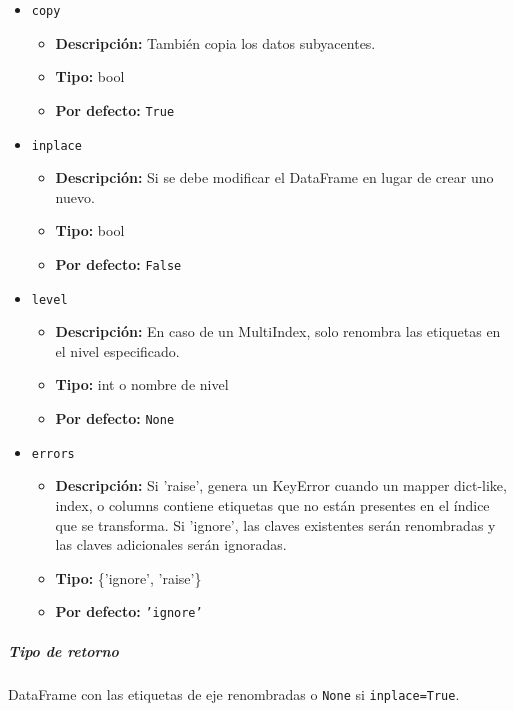 \begin{itemize}
    \item \texttt{copy}
          \begin{itemize}
              \item \textbf{Descripción:} También copia los datos subyacentes.
              \item \textbf{Tipo:} bool
              \item \textbf{Por defecto:} \texttt{True}
          \end{itemize}

    \item \texttt{inplace}
          \begin{itemize}
              \item \textbf{Descripción:} Si se debe modificar el DataFrame en
                    lugar de crear uno nuevo.
              \item \textbf{Tipo:} bool
              \item \textbf{Por defecto:} \texttt{False}
          \end{itemize}

    \item \texttt{level}
          \begin{itemize}
              \item \textbf{Descripción:} En caso de un MultiIndex, solo
                    renombra las etiquetas en el nivel especificado.
              \item \textbf{Tipo:} int o nombre de nivel
              \item \textbf{Por defecto:} \texttt{None}
          \end{itemize}

    \item \texttt{errors}
          \begin{itemize}
              \item \textbf{Descripción:} Si 'raise', genera un KeyError cuando
                    un mapper dict-like, index, o columns contiene etiquetas que no están presentes
                    en el índice que se transforma. Si 'ignore', las claves existentes serán
                    renombradas y las claves adicionales serán ignoradas.
              \item \textbf{Tipo:} \{'ignore', 'raise'\}
              \item \textbf{Por defecto:} \texttt{'ignore'}
          \end{itemize}
\end{itemize}

\subparagraph{Tipo de retorno}
DataFrame con las etiquetas de eje renombradas o \texttt{None} si
\texttt{inplace=True}.

